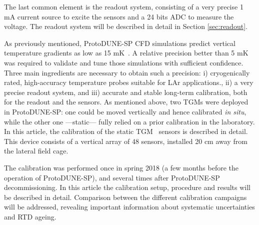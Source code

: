 The last common element is the readout system, consisting of a very precise 1 mA current source to excite the sensors and a 24 bits ADC to measure the voltage. The readout system will be described in detail in Section \ref{sec:readout}.

As previously mentioned, ProtoDUNE-SP CFD simulations predict vertical temperature gradients as low as 15 mK~\cite{pdsp_tdr}. A relative precision better than 5 mK was required to validate and tune those simulations with sufficient confidence. Three main ingredients are necessary to obtain such a precision: i) cryogenically rated, high-accuracy temperature probes suitable for LAr applications., ii) a very precise readout system, and iii) accurate and stable long-term calibration, both for the readout and the sensors. As mentioned above, two TGMs were deployed in ProtoDUNE-SP: one could be moved vertically and hence calibrated \textit{in situ}, while the other one ---static--- fully relied on a prior calibration in the laboratory. In this article, the calibration of the static TGM~\cite{tfm} sensors is described in detail. This device consists of a vertical array of 48 sensors, installed 20 cm away from the lateral field cage.

The calibration was performed once in spring 2018  (a few months before the operation of ProtoDUNE-SP), and several times after ProtoDUNE-SP decommissioning. In this article the calibration setup, procedure and results will be described in detail. Comparison between the different calibration campaigns will be addressed, revealing important information about systematic uncertainties and RTD ageing.